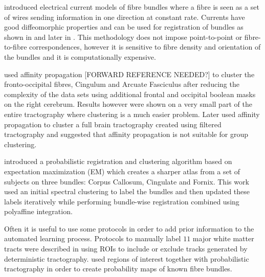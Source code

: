 \documentclass{bioinfo}
\begin{document}
\citet{Durrleman2009} introduced electrical current models of fibre
bundles where a fibre is seen as a set of wires sending information in
one direction at constant rate. Currents have good diffeomorphic
properties and can be used for registration of bundles as shown in
\citet{Durrleman2009} and later in \citet{durrleman2010registration}.
This methodology does not impose point-to-point or fibre-to-fibre
correspondences, however it is sensitive to fibre density and
orientation of the bundles and it is computationally expensive.

\citet*{leemans17new} used affinity propagation [FORWARD REFERENCE
NEEDED?] to cluster the fronto-occipital fibres, Cingulum and Arcuate
Fasciculus after reducing the complexity of the data sets using
additional frontal and occipital boolean masks on the right
cerebrum. Results however were shown on a very small part of the entire
tractography where clustering is a much easier problem.  Later
\citet{malcolm2009filtered} used affinity propagation to cluster a full
brain tractography created using filtered tractography and suggested
that affinity propagation is not suitable for group clustering.

\citet{ziyan2009consistency} introduced a probabilistic registration and
clustering algorithm based on expectation maximization (EM) which
creates a sharper atlas from a set of subjects on three bundles: Corpus
Callosum, Cingulate and Fornix. This work used an initial spectral
clustering \citep{ODonnell_IEEETMI07} to label the bundles and then
updated these labels iteratively while performing bundle-wise
registration combined using polyaffine integration.

Often it is useful to use some protocols in order to add prior
information to the automated learning process. Protocols to manually
label $11$ major white matter tracts were described in
\citet{Wakana2007NeuroImage} using ROIs to include or exclude tracks
generated by deterministic tractography. \citet{Hua2008NeuroImage} used
regions of interest together with probabilistic tractography in order to
create probability maps of known fibre bundles.
\end{document}
